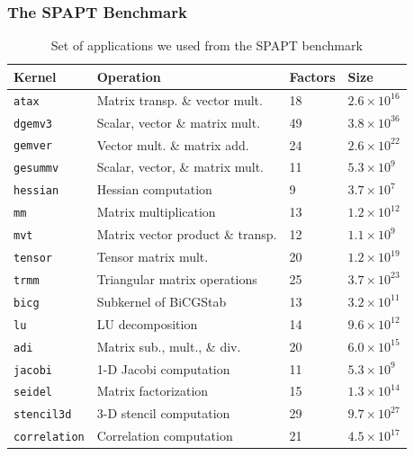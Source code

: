 \documentclass[conference]{IEEEtran}
\begin{document}
\subsubsection{The SPAPT Benchmark}
\label{sec:orgcbb5899}
\begin{table}[ht]
\caption{Set of applications we used from the SPAPT benchmark}
\centering
\scriptsize
\begin{tabular}{llll}
\toprule
Kernel & Operation & Factors & Size\\
\midrule
\texttt{atax} & Matrix transp. \& vector mult. & 18 & \(2.6 \times 10^{16}\)\\
\texttt{dgemv3} & Scalar, vector \& matrix mult. & 49 & \(3.8 \times 10^{36}\)\\
\texttt{gemver} & Vector mult. \& matrix add. & 24 & \(2.6 \times 10^{22}\)\\
\texttt{gesummv} & Scalar, vector, \& matrix mult. & 11 & \(5.3 \times 10^{9}\)\\
\texttt{hessian} & Hessian computation & 9 & \(3.7 \times 10^{7}\)\\
\texttt{mm} & Matrix multiplication & 13 & \(1.2 \times 10^{12}\)\\
\texttt{mvt} & Matrix vector product \& transp. & 12 & \(1.1 \times 10^{9}\)\\
\texttt{tensor} & Tensor matrix mult. & 20 & \(1.2 \times 10^{19}\)\\
\texttt{trmm} & Triangular matrix operations & 25 & \(3.7 \times 10^{23}\)\\
\texttt{bicg} & Subkernel of BiCGStab & 13 & \(3.2 \times 10^{11}\)\\
\texttt{lu} & LU decomposition & 14 & \(9.6 \times 10^{12}\)\\
\texttt{adi} & Matrix sub., mult., \& div. & 20 & \(6.0 \times 10^{15}\)\\
\texttt{jacobi} & 1-D Jacobi computation & 11 & \(5.3 \times 10^{9}\)\\
\texttt{seidel} & Matrix factorization & 15 & \(1.3 \times 10^{14}\)\\
\texttt{stencil3d} & 3-D stencil computation & 29 & \(9.7 \times 10^{27}\)\\
\texttt{correlation} & Correlation computation & 21 & \(4.5 \times 10^{17}\)\\
\bottomrule
\end{tabular}
\end{table}
\end{document}

